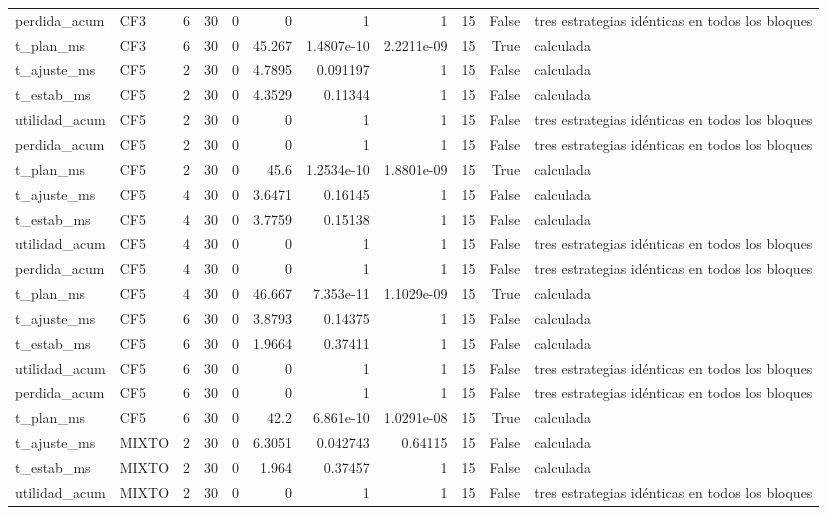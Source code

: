 \begin{tabular}{llrrrrrrrrl}
perdida_acum & CF3 & 6 & 30 & 0 & 0 & 1 & 1 & 15 & False & tres estrategias idénticas en todos los bloques \\
t_plan_ms & CF3 & 6 & 30 & 0 & 45.267 & 1.4807e-10 & 2.2211e-09 & 15 & True & calculada \\
t_ajuste_ms & CF5 & 2 & 30 & 0 & 4.7895 & 0.091197 & 1 & 15 & False & calculada \\
t_estab_ms & CF5 & 2 & 30 & 0 & 4.3529 & 0.11344 & 1 & 15 & False & calculada \\
utilidad_acum & CF5 & 2 & 30 & 0 & 0 & 1 & 1 & 15 & False & tres estrategias idénticas en todos los bloques \\
perdida_acum & CF5 & 2 & 30 & 0 & 0 & 1 & 1 & 15 & False & tres estrategias idénticas en todos los bloques \\
t_plan_ms & CF5 & 2 & 30 & 0 & 45.6 & 1.2534e-10 & 1.8801e-09 & 15 & True & calculada \\
t_ajuste_ms & CF5 & 4 & 30 & 0 & 3.6471 & 0.16145 & 1 & 15 & False & calculada \\
t_estab_ms & CF5 & 4 & 30 & 0 & 3.7759 & 0.15138 & 1 & 15 & False & calculada \\
utilidad_acum & CF5 & 4 & 30 & 0 & 0 & 1 & 1 & 15 & False & tres estrategias idénticas en todos los bloques \\
perdida_acum & CF5 & 4 & 30 & 0 & 0 & 1 & 1 & 15 & False & tres estrategias idénticas en todos los bloques \\
t_plan_ms & CF5 & 4 & 30 & 0 & 46.667 & 7.353e-11 & 1.1029e-09 & 15 & True & calculada \\
t_ajuste_ms & CF5 & 6 & 30 & 0 & 3.8793 & 0.14375 & 1 & 15 & False & calculada \\
t_estab_ms & CF5 & 6 & 30 & 0 & 1.9664 & 0.37411 & 1 & 15 & False & calculada \\
utilidad_acum & CF5 & 6 & 30 & 0 & 0 & 1 & 1 & 15 & False & tres estrategias idénticas en todos los bloques \\
perdida_acum & CF5 & 6 & 30 & 0 & 0 & 1 & 1 & 15 & False & tres estrategias idénticas en todos los bloques \\
t_plan_ms & CF5 & 6 & 30 & 0 & 42.2 & 6.861e-10 & 1.0291e-08 & 15 & True & calculada \\
t_ajuste_ms & MIXTO & 2 & 30 & 0 & 6.3051 & 0.042743 & 0.64115 & 15 & False & calculada \\
t_estab_ms & MIXTO & 2 & 30 & 0 & 1.964 & 0.37457 & 1 & 15 & False & calculada \\
utilidad_acum & MIXTO & 2 & 30 & 0 & 0 & 1 & 1 & 15 & False & tres estrategias idénticas en todos los bloques \\

\end{tabular}
